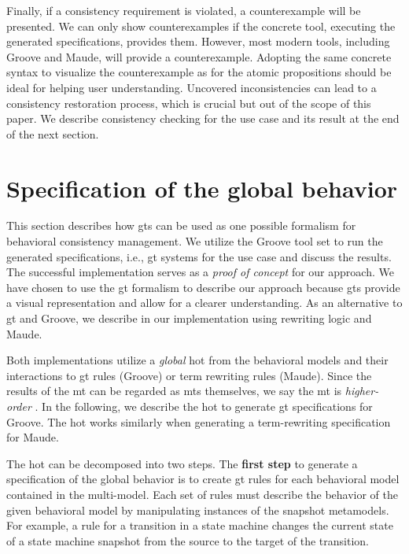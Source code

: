 \documentclass{jot}
\begin{document}
Finally, if a consistency requirement is violated, a counterexample will be presented.
We can only show counterexamples if the concrete tool, executing the generated specifications, provides them.
However, most modern tools, including Groove and Maude, will provide a counterexample.
Adopting the same concrete syntax to visualize the counterexample as for the atomic propositions should be ideal for helping user understanding. 
Uncovered inconsistencies can lead to a consistency restoration process, which is crucial but out of the scope of this paper.
We describe consistency checking for the use case and its result at the end of the next section.


\section{Specification of the global behavior} \label{sec:specification_of_the_global_behavior}
This section describes how \glspl*{gt} can be used as one possible formalism for behavioral consistency management.
We utilize the Groove tool set to run the generated specifications, i.e., \gls*{gt} systems \cite{rensinkGROOVESimulatorTool2004} for the use case and discuss the results.
The successful implementation serves as a \textit{proof of concept} for our approach.
We have chosen to use the \gls*{gt} formalism to describe our approach because \glspl*{gt} provide a visual representation and allow for a clearer understanding.
As an alternative to \gls*{gt} and Groove, we describe in \cite{krauterArtifactsBehavioralConsistency2023} our implementation using rewriting logic and Maude.

Both implementations utilize a \textit{global} \gls*{hot} from the behavioral models and their interactions to \gls*{gt} rules (Groove) or term rewriting rules (Maude).
Since the results of the \gls*{mt} can be regarded as \gls*{mt}s themselves, we say the \gls*{mt} is \textit{higher-order} \cite{tisiUseHigherOrderModel2009}.
In the following, we describe the \gls*{hot} to generate \gls*{gt} specifications for Groove.
The \gls*{hot} works similarly when generating a term-rewriting specification for Maude.

The \gls*{hot} can be decomposed into two steps.
The \textbf{first step} to generate a specification of the global behavior is to create \gls*{gt} rules for each behavioral model contained in the multi-model.
Each set of rules must describe the behavior of the given behavioral model by manipulating instances of the snapshot metamodels.
For example, a rule for a transition in a state machine changes the current state of a state machine snapshot from the source to the target of the transition. 
\end{document}
